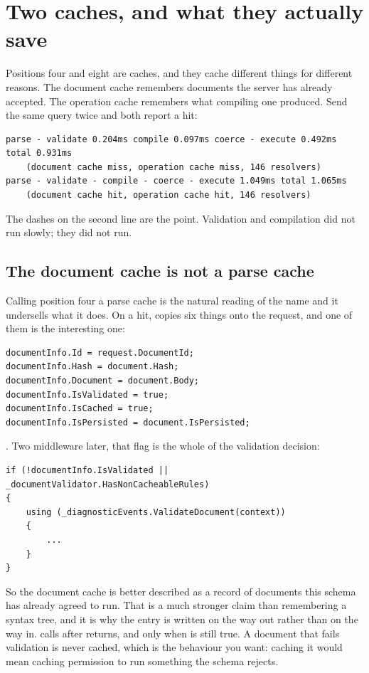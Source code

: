\section{Two caches, and what they actually save}
\label{sec:ch03-caches}

Positions four and eight are caches, and they cache different things for
different reasons. The document cache remembers documents the server has already
accepted. The operation cache remembers what compiling one produced. Send the
same query twice and both report a hit:

\begin{verbatim}
parse - validate 0.204ms compile 0.097ms coerce - execute 0.492ms total 0.931ms
    (document cache miss, operation cache miss, 146 resolvers)
parse - validate - compile - coerce - execute 1.049ms total 1.065ms
    (document cache hit, operation cache hit, 146 resolvers)
\end{verbatim}

The dashes on the second line are the point. Validation and compilation did not
run slowly; they did not run.

\subsection*{The document cache is not a parse cache}

%
Calling position four a parse cache is the natural reading of the name and it
undersells what it does. On a hit,  copies six
things onto the request, and one of them is the interesting one:

\begin{verbatim}
documentInfo.Id = request.DocumentId;
documentInfo.Hash = document.Hash;
documentInfo.Document = document.Body;
documentInfo.IsValidated = true;
documentInfo.IsCached = true;
documentInfo.IsPersisted = document.IsPersisted;
\end{verbatim}

. Two middleware later, that flag is the whole of the
validation decision:

\begin{verbatim}
if (!documentInfo.IsValidated || _documentValidator.HasNonCacheableRules)
{
    using (_diagnosticEvents.ValidateDocument(context))
    {
        ...
    }
}
\end{verbatim}

So the document cache is better described as a record of documents this schema
has already agreed to run. That is a much stronger claim than remembering a
syntax tree, and it is why the entry is written on the way out rather than on
the way in.  calls  after
 returns, and only when  is still
true. A document that fails validation is never cached, which is the behaviour
you want: caching it would mean caching permission to run something the schema
rejects.

